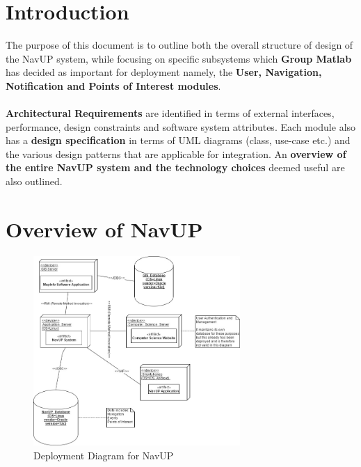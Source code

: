 \documentclass[runningheads,a4paper]{article}
\begin{document}



\begingroup



\tableofcontents


\endgroup

\newpage

\section{Introduction}
The purpose of this document is to outline both the overall structure of design of the NavUP system, while focusing on specific subsystems which \textbf{Group Matlab} has decided as important for deployment namely, the \textbf{User, Navigation, Notification and Points of Interest modules}.\\ \\
\noindent
\textbf{Architectural Requirements} are identified in terms of external interfaces, performance, design constraints and software system attributes. Each module also has a \textbf{design specification} in terms of UML diagrams (class, use-case etc.) and the various design patterns that are applicable for integration. An \textbf{overview of the entire NavUP system and the technology choices} deemed useful are also outlined.

\section{Overview of NavUP}

\begin{figure}[H]
   	\centering
   	\includegraphics[width=0.7\textwidth]{DeploymentDiagram.jpg}
   	\caption{Deployment Diagram for NavUP}
\end{figure}
\end{document}
